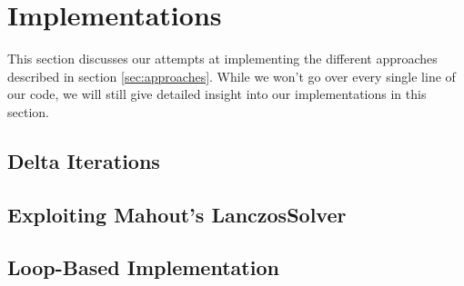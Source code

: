 \section{Implementations}


This section discusses our attempts at implementing the different approaches
described in section \ref{sec:approaches}. While we won't go over every single
line of our code, we will still give detailed insight into our implementations
in this section.

\subsection{Delta Iterations}

\subsection{Exploiting Mahout's LanczosSolver}

\subsection{Loop-Based Implementation}

